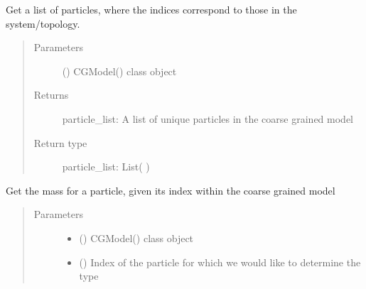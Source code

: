 \documentclass[letterpaper,12pt,english,openany,oneside]{sphinxmanual}
\begin{document}
\begin{fulllineitems}

\begin{fulllineitems}
\label{\detokenize{cg_model:cg_model.cgmodel.CGModel.get_particle_list}}
Get a list of particles, where the indices correspond to those in the system/topology.
\begin{quote}\begin{description}
\item[{Parameters}] \leavevmode
{} () \textendash{} CGModel() class object

\item[{Returns}] \leavevmode
particle\_list: A list of unique particles in the coarse grained model

\item[{Return type}] \leavevmode
particle\_list: List(  )

\end{description}\end{quote}

\end{fulllineitems}


\begin{fulllineitems}
\label{\detokenize{cg_model:cg_model.cgmodel.CGModel.get_particle_mass}}
Get the mass for a particle, given its index within the coarse grained model
\begin{quote}\begin{description}
\item[{Parameters}] \leavevmode\begin{itemize}
\item {} 
 () \textendash{} CGModel() class object

\item {} 
 () \textendash{} Index of the particle for which we would like to determine the type


\end{itemize}
\end{description}
\end{quote}
\end{fulllineitems}
\end{fulllineitems}
\end{document}
